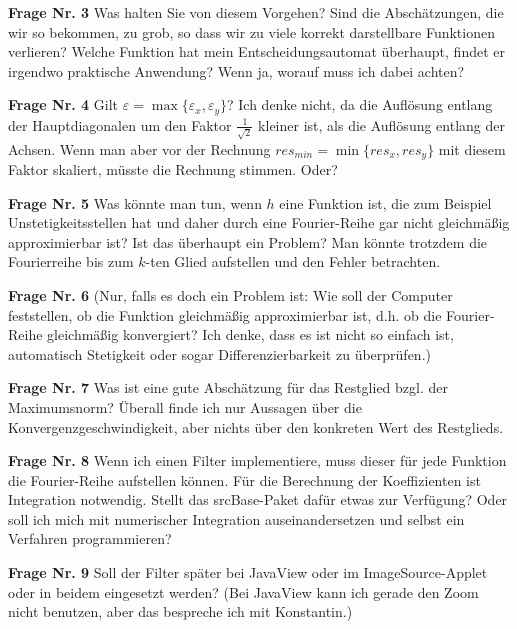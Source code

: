 \documentclass[a4paper]{article}
\begin{document}
\textbf{Frage Nr. 3} Was halten Sie von diesem Vorgehen? Sind die Abschätzungen, die wir so bekommen, zu grob, so dass wir zu viele korrekt darstellbare Funktionen verlieren? Welche Funktion hat mein Entscheidungsautomat überhaupt, findet er irgendwo praktische Anwendung? Wenn ja, worauf muss ich dabei achten?

\textbf{Frage Nr. 4} Gilt $\varepsilon=\max \{ \varepsilon_x, \varepsilon_y \}$? Ich denke nicht, da die Auflösung entlang der Hauptdiagonalen um den Faktor $\frac{1}{\sqrt{2}}$ kleiner ist, als die Auflösung entlang der Achsen. Wenn man aber vor der Rechnung $res_{min}=\min \{ res_x, res_y \}$ mit diesem Faktor skaliert, müsste die Rechnung stimmen. Oder?

\textbf{Frage Nr. 5} Was könnte man tun, wenn $h$ eine Funktion ist, die zum Beispiel Unstetigkeitsstellen hat und daher durch eine Fourier-Reihe gar nicht gleichmäßig approximierbar ist? Ist das überhaupt ein Problem? Man könnte trotzdem die Fourierreihe bis zum $k$-ten Glied aufstellen und den Fehler betrachten.

\textbf{Frage Nr. 6} (Nur, falls es doch ein Problem ist: Wie soll der Computer feststellen, ob die Funktion gleichmäßig approximierbar ist, d.h. ob die Fourier-Reihe gleichmäßig konvergiert? Ich denke, dass es ist nicht so einfach ist, automatisch Stetigkeit oder sogar Differenzierbarkeit zu überprüfen.)

\textbf{Frage Nr. 7} Was ist eine gute Abschätzung für das Restglied bzgl. der Maximumsnorm? Überall finde ich nur Aussagen über die Konvergenzgeschwindigkeit, aber nichts über den konkreten Wert des Restglieds.

\textbf{Frage Nr. 8} Wenn ich einen Filter implementiere, muss dieser für jede Funktion die Fourier-Reihe aufstellen können. Für die Berechnung der Koeffizienten ist Integration notwendig. Stellt das srcBase-Paket dafür etwas zur Verfügung? Oder soll ich mich mit numerischer Integration auseinandersetzen und selbst ein Verfahren programmieren?

\textbf{Frage Nr. 9} Soll der Filter später bei JavaView oder im ImageSource-Applet oder in beidem eingesetzt werden? (Bei JavaView kann ich gerade den Zoom nicht benutzen, aber das bespreche ich mit Konstantin.)



\end{document}

